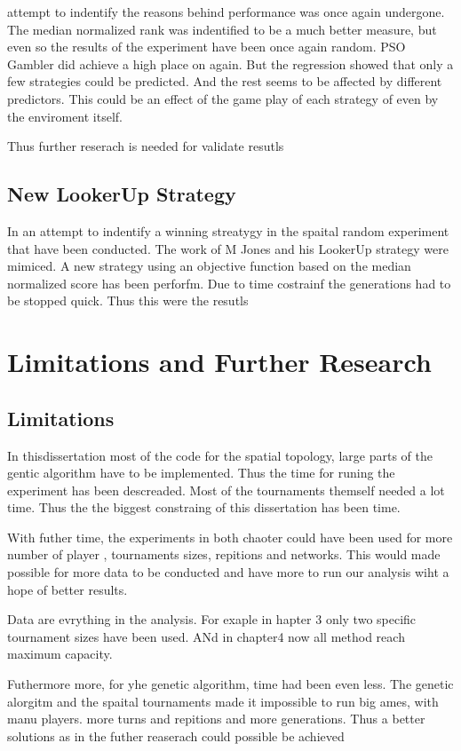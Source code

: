 attempt to indentify the reasons behind performance
was once again undergone. The median normalized rank was indentified to be a much better
measure, but even so the results of the experiment have been once again random.
PSO Gambler did achieve a high place on again. But the regression showed that
only a few strategies could be predicted. And the rest seems to be affected
by different predictors. This could be an effect of the game play of each strategy
of even by the enviroment itself.

Thus further reserach is needed for validate resutls
\subsection{New LookerUp Strategy}

In an attempt to indentify a winning streatygy in the spaital random experiment
that have been conducted. The work of M Jones and his LookerUp strategy were mimiced.
A new strategy using an objective function based on the median normalized score
has been perforfm. Due to time costrainf the generations had to be stopped
quick. Thus this were the resutls

\section{Limitations and Further Research}
\subsection{Limitations}

In thisdissertation most of the code for the spatial topology, large parts of the gentic algorithm
have to be implemented. Thus the time for runing the experiment has been descreaded.
Most of the tournaments themself needed a lot time. Thus the the biggest constraing
of this dissertation has been time.

With futher time, the experiments in both chaoter could have been used for
more number of player , tournaments sizes, repitions and networks. This would
made possible for more data to be conducted and have more to run our analysis
wiht a hope of better results.

Data are evrything in the analysis. For exaple in hapter 3 only two specific
tournament sizes have been used. ANd in chapter4 now all method reach maximum capacity.

Futhermore more, for yhe genetic algorithm, time had been even less. The genetic
alorgitm and the spaital tournaments made it impossible to run big ames, with
manu players. more turns and repitions and more generations. Thus a better solutions
as in the futher reaserach could possible be achieved


